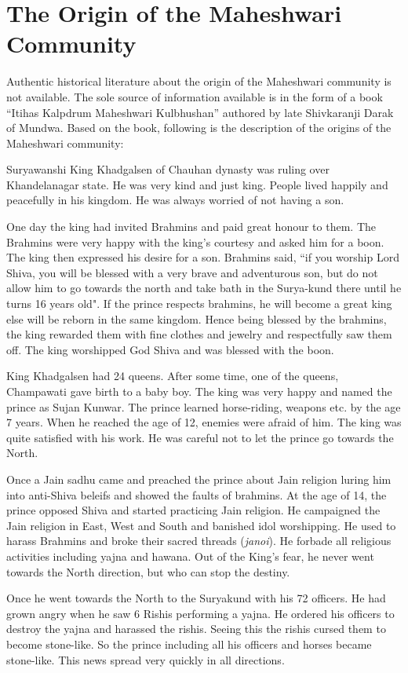 \chapter{The Origin of the Maheshwari Community}
Authentic historical literature about the origin of the Maheshwari community is not available. The sole source of information available is in the form of a book ``Itihas Kalpdrum Maheshwari Kulbhushan'' authored by late Shivkaranji Darak of Mundwa. Based on the book, following is the description of the origins of the Maheshwari community:

Suryawanshi King Khadgalsen of Chauhan dynasty was ruling over Khandelanagar state. He was very kind and just king. People lived happily and peacefully in his kingdom. He was always worried of not having a son.

One day the king had invited Brahmins and paid great honour to them. The Brahmins were very happy with the king's courtesy and asked him for a boon. The king then expressed his desire for a son. Brahmins said, ``if you worship Lord Shiva, you will be blessed with a very brave and adventurous son, but do not allow him to go towards the north and take bath in the Surya-kund there until he turns 16 years old". If the prince respects brahmins, he will become a great king else will be reborn in the same kingdom. Hence being blessed by the brahmins, the king rewarded them with fine clothes and jewelry and respectfully saw them off. The king worshipped God Shiva and was blessed with the boon.

King Khadgalsen had 24 queens. After some time, one of the queens, Champawati gave birth to a baby boy. The king was very happy and named the prince as Sujan Kunwar. The prince learned horse-riding, weapons etc. by the age 7 years. When he reached the age of 12, enemies were afraid of him. The king was quite satisfied with his work. He was careful not to let the prince go towards the North.

Once a Jain sadhu came and preached the prince about Jain religion luring him into anti-Shiva beleifs and showed the faults of brahmins. At the age of 14, the prince opposed Shiva and started practicing Jain religion. He campaigned the Jain religion in East, West and South and banished idol worshipping. He used to harass Brahmins and broke their sacred threads (\textit{janoi}). He forbade all religious activities including yajna and hawana. Out of the King's fear, he never went towards the North direction, but who can stop the destiny.

Once he went towards the North to the Suryakund with his 72 officers. He had grown angry when he saw 6 Rishis performing a yajna. He ordered his officers to destroy the yajna and harassed the rishis. Seeing this the rishis cursed them to become stone-like. So the prince including all his officers and horses became stone-like. This news spread very quickly in all directions.


